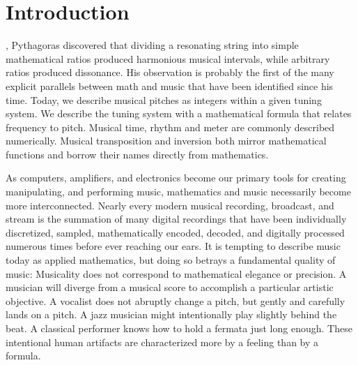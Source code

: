 \cleardoublepage
\chapter{Introduction}
\label{ch:introduction}
\begin{fullwidth}
  , Pythagoras discovered that
  dividing a resonating string into simple mathematical ratios
  produced harmonious musical intervals, while arbitrary ratios
  produced dissonance.  His observation is probably the first of the
  many explicit parallels between math and music that have been
  identified since his time. Today, we describe musical pitches as
  integers within a given tuning system. We describe the tuning system
  with a mathematical formula that relates frequency to pitch. Musical
  time, rhythm and meter are commonly described numerically. Musical
  transposition and inversion both mirror mathematical functions and
  borrow their names directly from mathematics.
\end{fullwidth}

As computers, amplifiers, and electronics become our primary tools for
creating manipulating, and performing music, mathematics and music
necessarily become more interconnected. Nearly every modern musical
recording, broadcast, and stream is the summation of many digital
recordings that have been individually discretized, sampled,
mathematically encoded, decoded, and digitally processed numerous
times before ever reaching our ears.\cite{Case2007} It is tempting to
describe music today as applied mathematics, but doing so betrays a
fundamental quality of music: Musicality does not correspond to %
mathematical elegance or precision. A musician will diverge from a
musical score to accomplish a particular artistic objective. A
vocalist does not abruptly change a pitch, but gently and carefully
lands on a pitch. A jazz musician might intentionally play slightly
behind the beat. A classical performer knows how to hold a fermata
just long enough. These intentional human artifacts are characterized
more by a feeling than by a formula.

